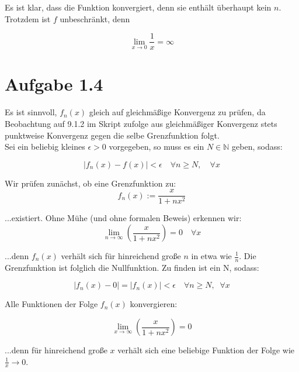 \documentclass[a4paper,german,12pt,smallheadings]{scrartcl}
\begin{document}
Es ist klar, dass die Funktion konvergiert, denn sie enthält überhaupt kein
$n$. Trotzdem ist $f$ unbeschränkt, denn

\begin{equation*}
  \lim_{x \to 0} \frac{1}{x} = \infty
\end{equation*}

\section{Aufgabe 1.4}


Es ist sinnvoll, $f_n(x)$ gleich auf gleichmäßige Konvergenz zu prüfen, da Beobachtung auf 9.1.2 im Skript zufolge aus gleichmäßiger Konvergenz stets punktweise Konvergenz gegen die selbe Grenzfunktion folgt.\\

Sei ein beliebig kleines $\epsilon>0$ vorgegeben, so muss es ein $N \in \mathbb{N}$ geben, sodass:

\begin{equation*}
|f_n(x)-f(x)|<\epsilon \quad \forall n \geq N, \quad \forall x
\end{equation*}

Wir prüfen zunächst, ob eine Grenzfunktion zu:
\begin{equation*}
f_n(x):= \frac{x}{1+nx^2}
\end{equation*}

...existiert. Ohne Mühe (und ohne formalen Beweis) erkennen wir:
\begin{equation*}
\lim\limits_{n \to \infty} \left(\frac{x}{1+nx^2}\right)=0 \quad \forall x
\end{equation*}

...denn $f_n(x)$ verhält sich für hinreichend große $n$ in etwa wie $\frac{1}{n}$. Die Grenzfunktion ist folglich die Nullfunktion. Zu finden ist ein N, sodass:

\begin{equation*}
|f_n(x)-0|=|f_n(x)|<\epsilon \quad \forall n \geq N, \;\; \forall x
\end{equation*}

Alle Funktionen der Folge $f_n(x)$ konvergieren:

\begin{equation*}
\lim\limits_{x \to \infty} \left(\frac{x}{1+nx^2}\right)=0
\end{equation*}

...denn für hinreichend große $x$ verhält sich eine beliebige Funktion der Folge wie $\frac{1}{x} \rightarrow 0$.
\end{document}
